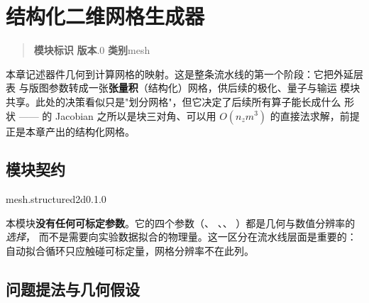 %

\chapter{结构化二维网格生成器}
\label{ch:mesh}

\begin{quote}
\small
\noindent\textbf{模块标识}\quad{}\qquad
\textbf{版本}.0\qquad
\textbf{类别}\quad mesh
\end{quote}

\noindent
本章记述器件几何到计算网格的映射。这是整条流水线的第一个阶段：它把外延层表
与版图参数转成一张\textbf{张量积}（结构化）网格，供后续的极化、量子与输运
模块共享。此处的决策看似只是"划分网格"，但它决定了后续所有算子能长成什么
形状 ——  的 Jacobian 之所以是块三对角、可以用
$O(n_zm^{3})$ 的直接法求解，前提正是本章产出的结构化网格。

\section{模块契约}
\label{sec:mesh-contract}

\begin{modulecard}{mesh.structured2d}{0.1.0}
  \cardsep
\end{modulecard}

本模块\textbf{没有任何可标定参数}。它的四个参数（、
、、
）都是几何与数值分辨率的\emph{选择}，
而不是需要向实验数据拟合的物理量。这一区分在流水线层面是重要的：
自动拟合循环只应触碰可标定量，网格分辨率不在此列。

\section{问题提法与几何假设}
\label{sec:mesh-problem}

